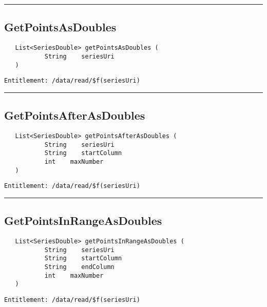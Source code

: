 \rule{12cm}{2pt}
\subsection{GetPointsAsDoubles}
\label{Api:GetPointsAsDoubles}
\begin{Verbatim}
   List<SeriesDouble> getPointsAsDoubles (
           String    seriesUri
   )
\end{Verbatim}
\begin{Verbatim}[formatcom=\color{Maroon}]
  Entitlement: /data/read/$f(seriesUri)
\end{Verbatim}



\rule{12cm}{2pt}
\subsection{GetPointsAfterAsDoubles}
\label{Api:GetPointsAfterAsDoubles}
\begin{Verbatim}
   List<SeriesDouble> getPointsAfterAsDoubles (
           String    seriesUri
           String    startColumn
           int    maxNumber
   )
\end{Verbatim}
\begin{Verbatim}[formatcom=\color{Maroon}]
  Entitlement: /data/read/$f(seriesUri)
\end{Verbatim}



\rule{12cm}{2pt}
\subsection{GetPointsInRangeAsDoubles}
\label{Api:GetPointsInRangeAsDoubles}
\begin{Verbatim}
   List<SeriesDouble> getPointsInRangeAsDoubles (
           String    seriesUri
           String    startColumn
           String    endColumn
           int    maxNumber
   )
\end{Verbatim}
\begin{Verbatim}[formatcom=\color{Maroon}]
  Entitlement: /data/read/$f(seriesUri)
\end{Verbatim}



